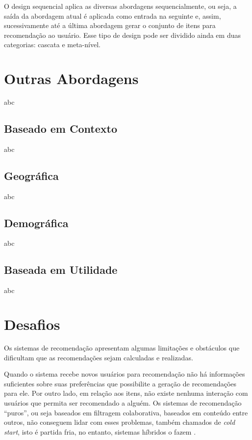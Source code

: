     O design sequencial aplica as diversas abordagens sequencialmente, ou seja, a saída da abordagem atual é aplicada como entrada na seguinte e, assim, sucessivamente até a última abordagem gerar o conjunto de itens para recomendação ao usuário. Esse tipo de design pode ser dividido ainda em duas categorias: cascata e meta-nível.
    
    
    \cite{Burke2002}    

    

\section{Outras Abordagens}
    abc 
    
    \subsection{Baseado em Contexto}
    abc
    
    \subsection{Geográfica}
    abc
    
    \subsection{Demográfica}
    abc
    
    \subsection{Baseada em Utilidade}
    
    abc
    
    
\section{Desafios} \label{sec:desafios}

    
    Os sistemas de recomendação apresentam algumas limitações e obstáculos que dificultam que as recomendações sejam calculadas e realizadas. 
    
    Quando o sistema recebe novos usuários para recomendação não há informações suficientes sobre suas preferências que possibilite a geração de  recomendações para ele. Por outro lado, em relação aos itens, não existe nenhuma interação com usuários que permita ser recomendado a alguém. Os sistemas de recomendação ``puros'', ou seja baseados em filtragem colaborativa, baseados em conteúdo entre outros, não conseguem lidar com esses problemas, também chamados de \textit{cold start}, isto é partida fria, no entanto, sistemas híbridos o fazem \cite{Miranda2010}.
    
